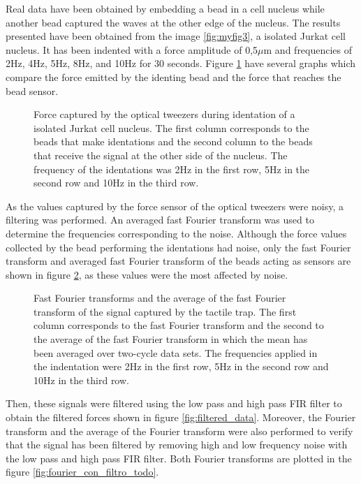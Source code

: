 \documentclass[12pt, a4paper]{article} %
\begin{document}
Real data have been obtained by embedding a bead in a cell nucleus while another bead captured the waves at the other edge of the nucleus. The results presented have been obtained from the image \ref{fig:myfig3}, a isolated Jurkat cell nucleus. It has been indented with a force amplitude of 0,5$\mu$m and frequencies of 2Hz, 4Hz, 5Hz, 8Hz, and 10Hz for 30 seconds. Figure \ref{fig:raw_data} have several graphs which compare the force emitted by the identing bead and the force that reaches the bead sensor. \\

\setlength{\parskip}{4mm}

\begin{figure}[htbp]
  \centering
  
  \caption{Force captured by the optical tweezers during identation of a isolated Jurkat cell nucleus. The first column corresponds to the beads that make identations and the second column to the beads that receive the signal at the other side of the nucleus. The frequency of the identations was 2Hz in the first row, 5Hz in the second row and 10Hz in the third row.}
  \label{fig:raw_data}
\end{figure}

As the values captured by the force sensor of the optical tweezers were noisy, a filtering was performed. An averaged fast Fourier transform was used to determine the frequencies corresponding to the noise. Although the force values collected by the bead performing the identations had noise, only the fast Fourier transform and averaged fast Fourier transform of the beads acting as sensors are shown in figure \ref{fig:fourier_sin_filtro}, as these values were the most affected by noise. 

\newpage

\begin{figure}[htbp]
  \centering
  
  \caption{Fast Fourier transforms and the average of the fast Fourier transform of the signal captured by the tactile trap. The first column corresponds to the fast Fourier transform and the second to the average of the fast Fourier transform in which the mean has been averaged over two-cycle data sets. The frequencies applied in the indentation were 2Hz in the first row, 5Hz in the second row and 10Hz in the third row.}
  \label{fig:fourier_sin_filtro}
\end{figure}

Then, these signals were filtered using the low pass and high pass FIR filter to obtain the filtered forces shown in figure \ref{fig:filtered_data}. Moreover, the Fourier transform and the average of the Fourier transform were also performed to verify that the signal has been filtered by removing high and low frequency noise with the low pass and high pass FIR filter. Both Fourier transforms are plotted in the figure \ref{fig:fourier_con_filtro_todo}.
\end{document}
